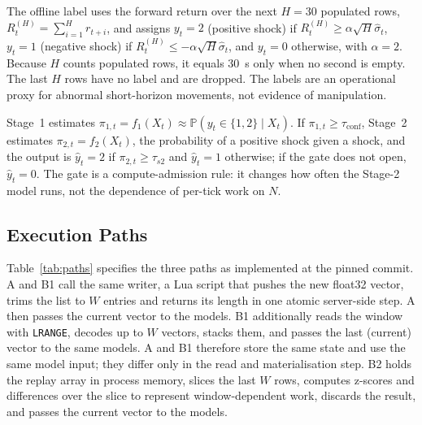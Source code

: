 \documentclass[a4paper,fleqn]{cas-dc}
\begin{document}
The offline label uses the forward return over the next $H=30$ populated rows, $R^{(H)}_t=\sum_{i=1}^{H} r_{t+i}$, and assigns $y_t=2$ (positive shock) if $R^{(H)}_t\ge\alpha\sqrt{H}\hat\sigma_t$, $y_t=1$ (negative shock) if $R^{(H)}_t\le-\alpha\sqrt{H}\hat\sigma_t$, and $y_t=0$ otherwise, with $\alpha=2$. Because $H$ counts populated rows, it equals 30~s only when no second is empty. The last $H$ rows have no label and are dropped. The labels are an operational proxy for abnormal short-horizon movements, not evidence of manipulation.

Stage~1 estimates $\pi_{1,t}=f_1(X_t)\approx\mathbb{P}(y_t\in\{1,2\}\mid X_t)$. If $\pi_{1,t}\ge\tau_{\mathrm{conf}}$, Stage~2 estimates $\pi_{2,t}=f_2(X_t)$, the probability of a positive shock given a shock, and the output is $\hat y_t=2$ if $\pi_{2,t}\ge\tau_{s2}$ and $\hat y_t=1$ otherwise; if the gate does not open, $\hat y_t=0$. The gate is a compute-admission rule: it changes how often the Stage-2 model runs, not the dependence of per-tick work on $N$.

\subsection{Execution Paths}
\label{subsec:paths}
Table~\ref{tab:paths} specifies the three paths as implemented at the pinned commit. A and B1 call the same writer, a Lua script that pushes the new float32 vector, trims the list to $W$ entries and returns its length in one atomic server-side step. A then passes the current vector to the models. B1 additionally reads the window with \texttt{LRANGE}, decodes up to $W$ vectors, stacks them, and passes the last (current) vector to the same models. A and B1 therefore store the same state and use the same model input; they differ only in the read and materialisation step. B2 holds the replay array in process memory, slices the last $W$ rows, computes z-scores and differences over the slice to represent window-dependent work, discards the result, and passes the current vector to the models.
\end{document}
